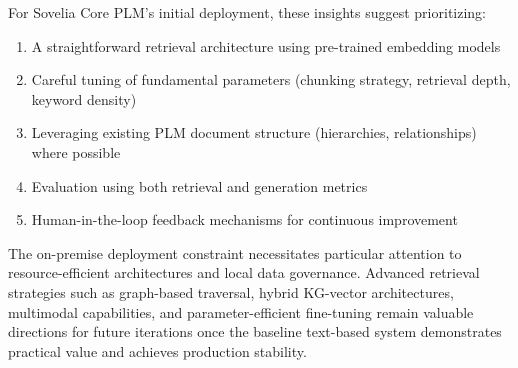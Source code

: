 For Sovelia Core PLM's initial deployment, these insights suggest prioritizing:

\begin{enumerate}
    \item A straightforward retrieval architecture using pre-trained embedding models
    \item Careful tuning of fundamental parameters (chunking strategy, retrieval depth, keyword density)
    \item Leveraging existing PLM document structure (hierarchies, relationships) where possible
    \item Evaluation using both retrieval and generation metrics
    \item Human-in-the-loop feedback mechanisms for continuous improvement
\end{enumerate}

The on-premise deployment constraint necessitates particular attention to resource-efficient architectures and local data governance. Advanced retrieval strategies such as graph-based traversal, hybrid KG-vector architectures, multimodal capabilities, and parameter-efficient fine-tuning remain valuable directions for future iterations once the baseline text-based system demonstrates practical value and achieves production stability.
